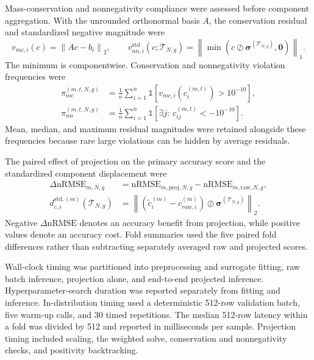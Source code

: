 \documentclass[12pt, twoside]{book}
\begin{document}
Mass-conservation and nonnegativity compliance were assessed before component aggregation. With the unrounded
orthonormal basis \(A\), the conservation residual and standardized negative magnitude were
\begin{equation}
\label{eq:ch2_physical_residuals}
v_{mc,i}(c)=\left\|Ac-b_i\right\|_2,\qquad
v_{nn,i}^{\mathrm{std}}\!\left(c;\mathcal{T}_{N,g}\right)
=\left\|\min\!\left(c\oslash\boldsymbol{\sigma}^{(\mathcal{T}_{N,g})},
\mathbf{0}\right)\right\|_1.
\end{equation}
The minimum is componentwise. Conservation and nonnegativity violation frequencies were
\begin{equation}
\label{eq:ch2_violation_frequencies}
\begin{aligned}
\pi_{mc}^{(m,t,N,g)}
&=\frac{1}{n}\sum_{i=1}^{n}
\mathbb{1}\!\left[v_{mc,i}\!\left(c_i^{(m,t)}\right)>10^{-10}\right],\\
\pi_{nn}^{(m,t,N,g)}
&=\frac{1}{n}\sum_{i=1}^{n}
\mathbb{1}\!\left[\exists j:\ c_{ij}^{(m,t)}<-10^{-10}\right].
\end{aligned}
\end{equation}
Mean, median, and maximum residual magnitudes were retained alongside these frequencies because rare large
violations can be hidden by average residuals.

The paired effect of projection on the primary accuracy score and the standardized component displacement were
\begin{equation}
\label{eq:ch2_projection_effects}
\begin{aligned}
\Delta\mathrm{nRMSE}_{m,N,g}
&=\mathrm{nRMSE}_{m,\mathrm{proj},N,g}
-\mathrm{nRMSE}_{m,\mathrm{raw},N,g},\\
d_{c,i}^{\mathrm{std},(m)}\!\left(\mathcal{T}_{N,g}\right)
&=\left\|\left(\tilde c_i^{(m)}-c_{raw,i}^{(m)}\right)
\oslash\boldsymbol{\sigma}^{(\mathcal{T}_{N,g})}\right\|_2.
\end{aligned}
\end{equation}
Negative \(\Delta\mathrm{nRMSE}\) denotes an accuracy benefit from projection, while positive values denote an
accuracy cost. Fold summaries used the five paired fold differences rather than subtracting separately averaged
raw and projected scores.

Wall-clock timing was partitioned into preprocessing and surrogate fitting, raw batch inference, projection
alone, and end-to-end projected inference. Hyperparameter-search duration was reported separately from fitting
and inference. In-distribution timing used a deterministic 512-row validation batch, five warm-up calls, and 30
timed repetitions. The median 512-row latency within a fold was divided by 512 and reported in milliseconds
per sample. Projection timing included scaling, the weighted solve, conservation and nonnegativity checks, and
positivity backtracking.
\end{document}

